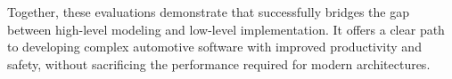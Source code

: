 Together, these evaluations demonstrate that \GRust successfully bridges the gap between high-level
modeling and low-level implementation. It offers a clear path to developing complex automotive
software with improved productivity and safety, without sacrificing the performance required for
modern \sdv architectures.
